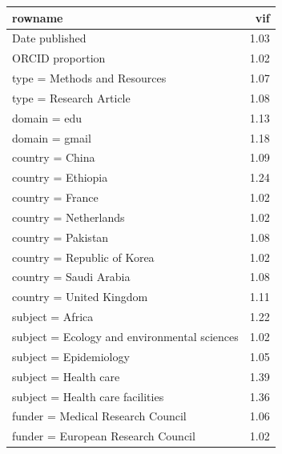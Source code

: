 \begin{table}[ht]
\centering
\begin{tabular}{lr}
 rowname & vif \\ 
  \hline
Date published & 1.03 \\ 
  ORCID proportion & 1.02 \\ 
  type = Methods and Resources & 1.07 \\ 
  type = Research Article & 1.08 \\ 
  domain = edu & 1.13 \\ 
  domain = gmail & 1.18 \\ 
  country = China & 1.09 \\ 
  country = Ethiopia & 1.24 \\ 
  country = France & 1.02 \\ 
  country = Netherlands & 1.02 \\ 
  country = Pakistan & 1.08 \\ 
  country = Republic of Korea & 1.02 \\ 
  country = Saudi Arabia & 1.08 \\ 
  country = United Kingdom & 1.11 \\ 
  subject = Africa & 1.22 \\ 
  subject = Ecology and environmental sciences & 1.02 \\ 
  subject = Epidemiology & 1.05 \\ 
  subject = Health care & 1.39 \\ 
  subject = Health care facilities & 1.36 \\ 
  funder = Medical Research Council & 1.06 \\ 
  funder = European Research Council & 1.02 \\ 
  \end{tabular}
\end{table}

